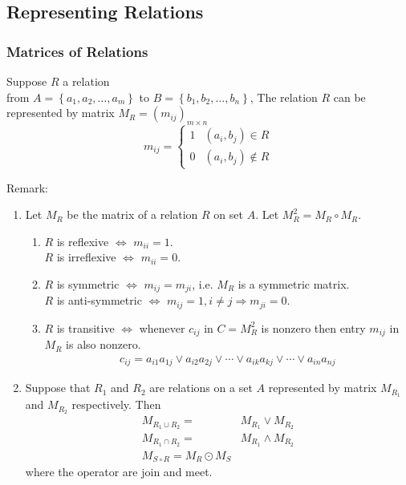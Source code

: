 \subsection{Representing Relations}
\subsubsection{Matrices of Relations}
\begin{definition}
    Suppose $R$ a relation \\ from $A=\left\{ a_1,a_2,\dots,a_m \right\}$ to $B=\left\{ b_1,b_2,\dots,b_n \right\}$, The relation $R$ can be represented by matrix $M_R=(m_{ij})_{m\times n}$
    \[ m_{ij}=\left\{ \begin{array}{lc}
        1 & (a_i,b_j)\in R \\ 0 & (a_i,b_j)\notin R
    \end{array} \right. \]
\end{definition}
Remark:
\begin{enumerate}
    \item Let $M_R$ be the matrix of a relation $R$ on set $A$. Let $M_R^2=M_R\circ M_R$.
    \begin{enumerate}
        \item $R$ is reflexive $\Leftrightarrow$ $m_{ii}=1$.\\
        $R$ is irreflexive $\Leftrightarrow$ $m_{ii}=0$.
        \item  $R$ is symmetric $\Leftrightarrow$ $m_{ij}=m_{ji}$, i.e. $M_R$ is a symmetric matrix. \\
        $R$ is anti-symmetric $\Leftrightarrow$ $m_{ij}=1, i\ne j \Rightarrow m_{ji}=0$. 
        \item $R$ is transitive $\Leftrightarrow$ whenever $c_{ij}$ in $C=M_R^2$ is nonzero then entry $m_{ij}$ in $M_R$ is also nonzero. 
        \begin{align*}
            c_{ij}=a_{i1}a_{1j}\lor a_{i2}a_{2j} \lor \cdots \lor a_{ik}a_{kj} \lor \cdots \lor a_{in}a_{nj}
        \end{align*}
    \end{enumerate}
    \item Suppose that $R_1$ and $R_2$ are relations on a set $A$ represented by matrix $M_{R_1}$ and $M_{R_2}$ respectively. Then 
    \begin{align*}
        M_{R_1\cup R_2}=&M_{R_1}\lor M_{R_2}\\
        M_{R_1\cap R_2}=&M_{R_1}\land M_{R_2}\\
        M_{S\circ R}=M_R\odot  M_S
    \end{align*}
    where the operator are join and meet. 
\end{enumerate}

